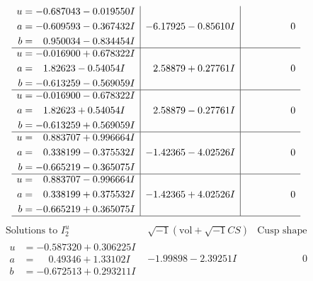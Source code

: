 \documentclass[1p]{elsarticle_modified}
\theoremstyle{definition}
\newcommand{\I}{\sqrt{-1}}
\begin{document}
$$\begin{array}{c|c|c}
\begin{aligned}
u &= -0.687043 - 0.019550 I \\
a &= -0.609593 - 0.367432 I \\
b &= \phantom{-}0.950034 - 0.834454 I\end{aligned}
 & -6.17925 - 0.85610 I & \phantom{-0.000000 } 0 \\ \hline\begin{aligned}
u &= -0.016900 + 0.678322 I \\
a &= \phantom{-}1.82623 - 0.54054 I \\
b &= -0.613259 - 0.569059 I\end{aligned}
 & \phantom{-}2.58879 + 0.27761 I & \phantom{-0.000000 } 0 \\ \hline\begin{aligned}
u &= -0.016900 - 0.678322 I \\
a &= \phantom{-}1.82623 + 0.54054 I \\
b &= -0.613259 + 0.569059 I\end{aligned}
 & \phantom{-}2.58879 - 0.27761 I & \phantom{-0.000000 } 0 \\ \hline\begin{aligned}
u &= \phantom{-}0.883707 + 0.996664 I \\
a &= \phantom{-}0.338199 - 0.375532 I \\
b &= -0.665219 - 0.365075 I\end{aligned}
 & -1.42365 - 4.02526 I & \phantom{-0.000000 } 0 \\ \hline\begin{aligned}
u &= \phantom{-}0.883707 - 0.996664 I \\
a &= \phantom{-}0.338199 + 0.375532 I \\
b &= -0.665219 + 0.365075 I\end{aligned}
 & -1.42365 + 4.02526 I & \phantom{-0.000000 } 0\\
 \hline 
 \end{array}$$\newpage$$\begin{array}{c|c|c}  
\text{Solutions to }I^u_{2}& \I (\text{vol} + \sqrt{-1}CS) & \text{Cusp shape}\\
 \hline 
\begin{aligned}
u &= -0.587320 + 0.306225 I \\
a &= \phantom{-}0.49346 + 1.33102 I \\
b &= -0.672513 + 0.293211 I\end{aligned}
 & -1.99898 - 2.39251 I & \phantom{-0.000000 } 0 \\ \hline\begin{aligned}

\end{aligned}
\end{array}$$
\end{document}
